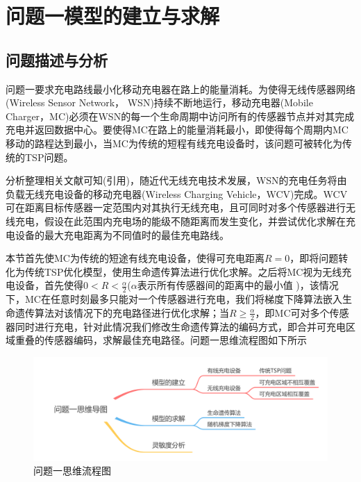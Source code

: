 \documentclass{whutmod}
\newcommand{\upcite}[1]{\textsuperscript{\cite{#1}}}
\begin{document}
	\section{问题一模型的建立与求解}
		\subsection{问题描述与分析}
		
			问题一要求充电路线最小化移动充电器在路上的能量消耗。为使得无线传感器网络
		(Wireless Sensor Network，	WSN)持续不断地运行，移动充电器(Mobile Charger，MC)必须在WSN的每一个生命周期中访问所有的传感器节点并对其完成充电并返回数据中心。要使得MC在路上的能量消耗最小，即使得每个周期内MC移动的路程达到最小，当MC为传统的短程有线充电设备时，该问题可被转化为传统的TSP问题。
		    
		    分析整理相关文献可知(引用)，随近代无线充电技术发展，WSN的充电任务将由负载无线充电设备的移动充电器(Wireless Charging Vehicle，WCV)完成。WCV可在距离目标传感器一定范围内对其执行无线充电，且可同时对多个传感器进行无线充电，假设在此范围内充电场的能级不随距离而发生变化，并尝试优化求解在充电设备的最大充电距离为不同值时的最佳充电路线。
		    
		    本节首先使MC为传统的短途有线充电设备，使得可充电距离$R=0$，即将问题转化为传统TSP优化模型，使用生命遗传算法进行优化求解。之后将MC视为无线充电设备，首先使得$0<R<\frac{\alpha }{2}$($\alpha$表示所有传感器间的距离中的最小值 )，该情况下，MC在任意时刻最多只能对一个传感器进行充电，我们将梯度下降算法嵌入生命遗传算法对该情况下的充电路径进行优化求解；当$R\geqslant \frac{\alpha }{2}$，即MC可对多个传感器同时进行充电，针对此情况我们修改生命遗传算法的编码方式，即合并可充电区域重叠的传感器编码，求解最佳充电路径。问题一思维流程图如下所示
			
		  \begin{figure}[H]
				\centering
				\includegraphics[width=\textwidth]{figures/1.png}
				\caption{问题一思维流程图}\label{asdf}
			\end{figure}
		
\end{document}
